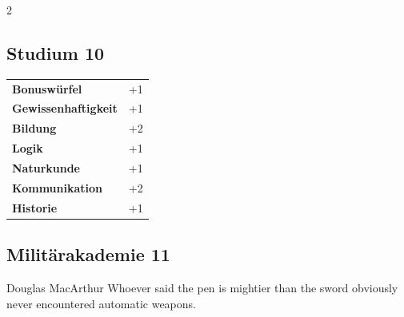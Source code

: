 \begin{multicols}{2}
\begin{tcolorbox}

\end{tcolorbox}

\begin{tcolorbox}
    \subsection*{Studium \hfill \small{10 }}
    \tcblower




\begin{tabular}{@{}ll@{}}
    \textbf{Bonuswürfel} & +1\\
    \textbf{Gewissenhaftigkeit} & +1\\
    \textbf{Bildung} & +2\\
    \textbf{Logik} & +1\\
    \textbf{Naturkunde} & +1\\
    \textbf{Kommunikation} & +2\\
    \textbf{Historie} & +1\\
\end{tabular}


\end{tcolorbox}

\begin{tcolorbox}
    \subsection*{Militärakademie \hfill \small{11 }}
    \tcblower


\begin{pquote}{Douglas MacArthur}
Whoever said the pen is mightier than the sword obviously never encountered automatic weapons.
\end{pquote}

\vspace{3mm}


\end{tcolorbox}
\end{multicols}
